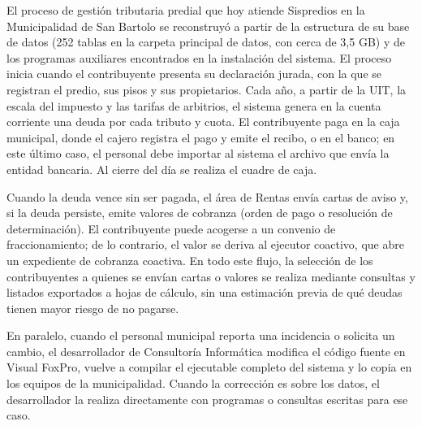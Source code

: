 \documentclass[12pt,a4paper]{report}
\begin{document}
El proceso de gestión tributaria predial que hoy atiende Sispredios en la Municipalidad de San Bartolo se reconstruyó a partir de la estructura de su base de datos (252 tablas en la carpeta principal de datos, con cerca de 3,5 GB) y de los programas auxiliares encontrados en la instalación del sistema. %
El proceso inicia cuando el contribuyente presenta su declaración jurada, con la que se registran el predio, sus pisos y sus propietarios. Cada año, a partir de la UIT, la escala del impuesto y las tarifas de arbitrios, el sistema genera en la cuenta corriente una deuda por cada tributo y cuota. El contribuyente paga en la caja municipal, donde el cajero registra el pago y emite el recibo, o en el banco; en este último caso, el personal debe importar al sistema el archivo que envía la entidad bancaria. Al cierre del día se realiza el cuadre de caja.

Cuando la deuda vence sin ser pagada, el área de Rentas envía cartas de aviso y, si la deuda persiste, emite valores de cobranza (orden de pago o resolución de determinación). El contribuyente puede acogerse a un convenio de fraccionamiento; de lo contrario, el valor se deriva al ejecutor coactivo, que abre un expediente de cobranza coactiva. En todo este flujo, la selección de los contribuyentes a quienes se envían cartas o valores se realiza mediante consultas y listados exportados a hojas de cálculo, sin una estimación previa de qué deudas tienen mayor riesgo de no pagarse.

En paralelo, cuando el personal municipal reporta una incidencia o solicita un cambio, el desarrollador de Consultoría Informática modifica el código fuente en Visual FoxPro, vuelve a compilar el ejecutable completo del sistema y lo copia en los equipos de la municipalidad. Cuando la corrección es sobre los datos, el desarrollador la realiza directamente con programas o consultas escritas para ese caso.
\end{document}
